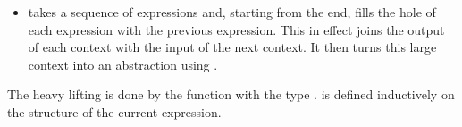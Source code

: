 \begin{itemize}
\item {} takes a sequence of expressions and, starting from the end, fills the hole of each expression with the previous expression. This in effect joins the output of each context with the input of the next context. It then turns this large context into an abstraction using .

  \begin{comment}
  seqToAbs es = contextToAbs $ foldr ret Hole $ reverse es
  \end{comment}
  \begin{Shaded}
  \begin{Highlighting}[]
  \FunctionTok{=} \FunctionTok{$}  \FunctionTok{$} 
  \end{Highlighting}
  \end{Shaded}



\end{itemize}

The heavy lifting is done by the function  with the type .  is defined inductively on the structure of the current expression.


